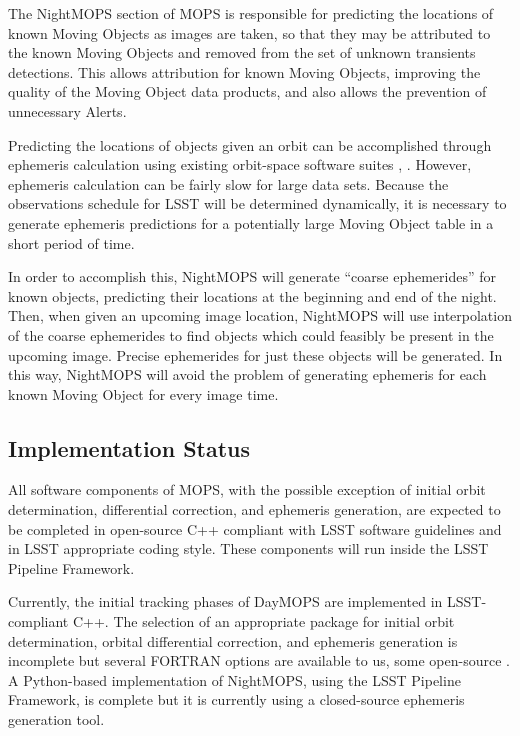 \documentclass[12pt,preprint]{aastex}
\begin{document}
The NightMOPS section of MOPS is responsible for predicting the
locations of known Moving Objects as images are taken, so that they
may be attributed to the known Moving Objects and removed from the set
of unknown transients detections.  This allows attribution for known
Moving Objects, improving the quality of the Moving Object data
products, and also allows the prevention of unnecessary Alerts.

Predicting the locations of objects given an orbit can be accomplished
through ephemeris calculation using existing orbit-space software
suites \citep{Milani2006}, \citep{OpenOrb2009}.  However, ephemeris
calculation can be fairly slow for large data sets.  Because the
observations schedule for LSST will be determined dynamically, it is
necessary to generate ephemeris predictions for a potentially large
Moving Object table in a short period of time.


In order to accomplish this, NightMOPS will generate ``coarse
ephemerides'' for known objects, predicting their locations at the
beginning and end of the night.  Then, when given an upcoming image
location, NightMOPS will use interpolation of the coarse ephemerides
to find objects which could feasibly be present in the upcoming
image. Precise ephemerides for just these objects will be
generated. In this way, NightMOPS will avoid the problem of generating
ephemeris for each known Moving Object for every image time.


\subsection{Implementation Status}

All software components of MOPS, with the possible exception of
initial orbit determination, differential correction, and ephemeris
generation, are expected to be completed in open-source C++ compliant
with LSST software guidelines and in LSST appropriate coding style.
These components will run inside the LSST Pipeline Framework.

Currently, the initial tracking phases of DayMOPS are implemented in
LSST-compliant C++.  The selection of an appropriate package for
initial orbit determination, orbital differential correction, and
ephemeris generation is incomplete but several FORTRAN options are
available to us, some open-source \citep{Milani2006}
\citep{OpenOrb2009}.  A Python-based implementation of NightMOPS,
using the LSST Pipeline Framework, is complete but it is currently
using a closed-source ephemeris generation tool.
\end{document}
